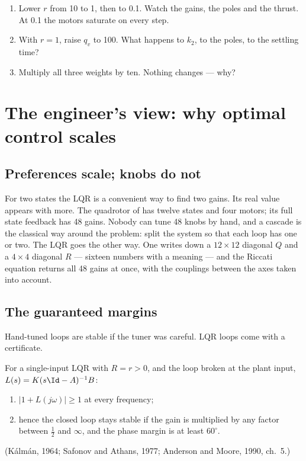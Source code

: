 \begin{trythis}
\begin{enumerate}
  \item Lower $r$ from 10 to 1, then to 0.1. Watch the gains, the poles and the thrust. At 0.1 the motors saturate on every step.
  \item With $r = 1$, raise $q_v$ to 100. What happens to $k_2$, to the poles, to the settling time?
  \item Multiply all three weights by ten. Nothing changes — why?
\end{enumerate}
\end{trythis}

\section{The engineer's view: why optimal control scales}

\subsection{Preferences scale; knobs do not}
For two states the LQR is a convenient way to find two gains. Its real value appears with more. The quadrotor of  has twelve states and four motors; its full state feedback has 48 gains. Nobody can tune 48 knobs by hand, and a cascade is the classical way around the problem: split the system so that each loop has one or two. The LQR goes the other way. One writes down a $12 \times 12$ diagonal $Q$ and a $4 \times 4$ diagonal $R$ — sixteen numbers with a meaning — and the Riccati equation returns all 48 gains at once, with the couplings between the axes taken into account.

\subsection{The guaranteed margins}
Hand-tuned loops are stable if the tuner was careful. LQR loops come with a certificate.

\begin{theorem}
\label{thm:lqr-margins}
For a single-input LQR with $R = r > 0$, and the loop broken at the plant input, $L(s) = K(s\Id - A)^{-1}B$:
\begin{enumerate}[label=(\roman*)]
  \item $|1 + L(j\omega)| \ge 1$ at every frequency;
  \item hence the closed loop stays stable if the gain is multiplied by any factor between $\tfrac12$ and $\infty$, and the phase margin is at least $60^\circ$.
\end{enumerate}
(Kálmán, 1964; Safonov and Athans, 1977; Anderson and Moore, 1990, ch.~5.)
\end{theorem}

